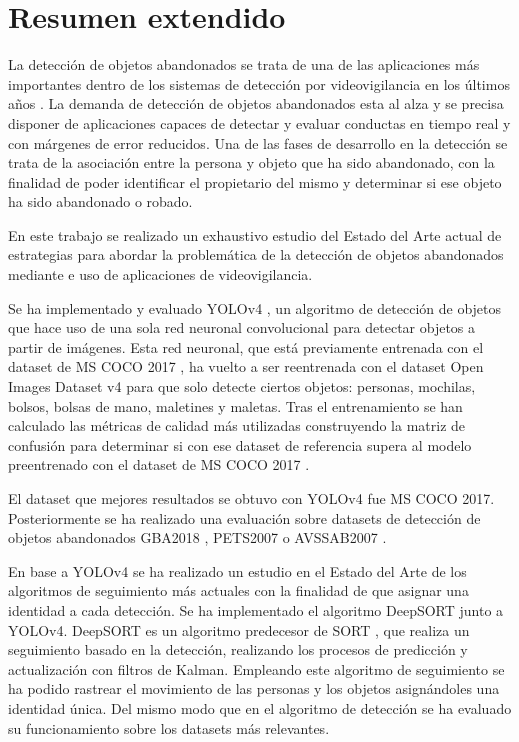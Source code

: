 
\chapter*{Resumen extendido}
\label{cha:resumen-extendido}


La detección de objetos abandonados se trata de una de las aplicaciones más importantes dentro de los sistemas de detección por videovigilancia en los últimos años \cite{DBLP:journals/spm/PlataniotisR05}. La demanda de detección de objetos abandonados esta al alza y se precisa disponer de aplicaciones capaces de detectar y evaluar conductas en tiempo real y con márgenes de error reducidos. Una de las fases de desarrollo en la detección se trata de la asociación entre la persona y objeto que ha sido abandonado, con la finalidad de poder identificar el propietario del mismo y determinar si ese objeto ha sido abandonado o robado.

En este trabajo se realizado un exhaustivo estudio del Estado del Arte actual de estrategias para abordar la problemática de la detección de objetos abandonados mediante e uso de aplicaciones de videovigilancia.

Se ha implementado y evaluado YOLOv4 \cite{bochkovskiy2020yolov4}, un algoritmo de detección de objetos que hace uso de una sola red neuronal convolucional para detectar objetos a partir de imágenes. Esta red neuronal, que está previamente entrenada con el dataset de MS COCO 2017 \cite{lin2015microsoft}, ha vuelto a ser reentrenada con el dataset Open Images Dataset v4 \cite{Kuznetsova_2020} para que solo detecte ciertos objetos: personas, mochilas, bolsos, bolsas de mano, maletines y maletas. Tras el entrenamiento se han calculado las métricas de calidad más utilizadas construyendo la matriz de confusión para determinar si con ese dataset de referencia supera al modelo preentrenado con el dataset de MS COCO 2017 \cite{lin2015microsoft}.

El dataset que mejores resultados se obtuvo con YOLOv4 \cite{bochkovskiy2020yolov4} fue MS COCO 2017. Posteriormente se ha realizado una evaluación sobre datasets de detección de objetos abandonados GBA2018 \cite{gba-dataset}, PETS2007 \cite{pets2007-dataset} o AVSSAB2007 \cite{AVSSAB2007-dataset}. 

En base a YOLOv4 se ha realizado un estudio en el Estado del Arte de los algoritmos de seguimiento más actuales con la finalidad de que asignar una identidad a cada detección. Se ha implementado el algoritmo DeepSORT \cite{Wojke2017simple} junto a YOLOv4. DeepSORT  es un algoritmo predecesor de SORT \cite{Bewley_2016}, que realiza un seguimiento basado en la detección, realizando los procesos de predicción y actualización con filtros de Kalman. Empleando este algoritmo de seguimiento se ha podido rastrear el movimiento de las personas y los objetos asignándoles una identidad única. Del mismo modo que en el algoritmo de detección se ha evaluado su funcionamiento sobre los datasets más relevantes.

